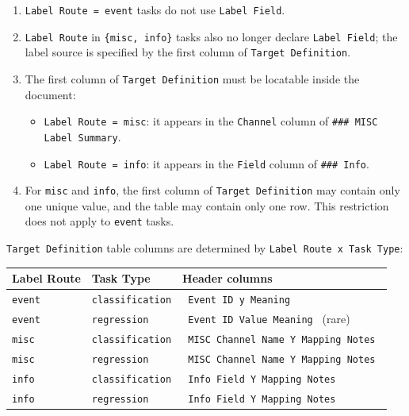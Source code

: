 \begin{tcolorbox}
\begin{enumerate}[leftmargin=1.5em,noitemsep,topsep=2pt]
\item \texttt{Label Route = event} tasks do not use \texttt{Label Field}.
\item \texttt{Label Route} in \texttt{\{misc, info\}} tasks also no longer declare \texttt{Label Field}; the label source is specified by the first column of \texttt{Target Definition}.
\item The first column of \texttt{Target Definition} must be locatable inside the document:
\begin{itemize}[leftmargin=1.2em,noitemsep,topsep=1pt]
\item \texttt{Label Route = misc}: it appears in the \texttt{Channel} column of \texttt{\#\#\# MISC Label Summary}.
\item \texttt{Label Route = info}: it appears in the \texttt{Field} column of \texttt{\#\#\# Info}.
\end{itemize}
\item For \texttt{misc} and \texttt{info}, the first column of \texttt{Target Definition} may contain only one unique value, and the table may contain only one row. This restriction does not apply to \texttt{event} tasks.
\end{enumerate}

\smallskip{}\par\smallskip

\noindent \texttt{Target Definition} table columns are determined by \texttt{Label Route x Task Type}:\par\smallskip

\begingroup\footnotesize
\begin{tabular}{@{}p{}p{}p{}@{}}
\toprule
\textbf{Label Route} & \textbf{Task Type} & \textbf{Header columns} \\
\midrule
\texttt{event} & \texttt{classification} & \texttt{\textbar{} Event ID \textbar{} y \textbar{} Meaning \textbar{}} \\
\texttt{event} & \texttt{regression} & \texttt{\textbar{} Event ID \textbar{} Value \textbar{} Meaning \textbar{}} (rare) \\
\texttt{misc} & \texttt{classification} & \texttt{\textbar{} MISC Channel Name \textbar{} Y Mapping Notes \textbar{}} \\
\texttt{misc} & \texttt{regression} & \texttt{\textbar{} MISC Channel Name \textbar{} Y Mapping Notes \textbar{}} \\
\texttt{info} & \texttt{classification} & \texttt{\textbar{} Info Field \textbar{} Y Mapping Notes \textbar{}} \\
\texttt{info} & \texttt{regression} & \texttt{\textbar{} Info Field \textbar{} Y Mapping Notes \textbar{}} \\
\bottomrule
\end{tabular}
\endgroup


\end{tcolorbox}
